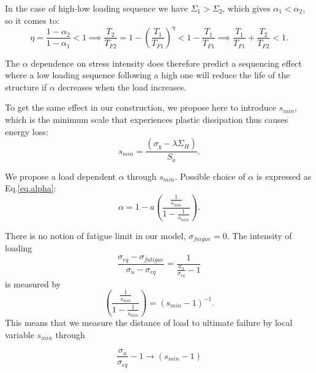In the case of high-low loading sequence we have $\Sigma_1>\Sigma_2$,  which gives $\alpha_1<\alpha_2$, so it comes to:
$$\eta=\frac{1-\alpha_2}{1-\alpha_1}<1 \implies
\frac{T_2}{T_{F2}}=1-\left( \frac{T_1}{T_{F1}}\right) ^\eta<1-\frac{T_1}{T_{F1}} \implies
\frac{T_1}{T_{F1}}+\frac{T_2}{T_{F2}}<1.$$

The $\alpha$ dependence on stress intensity does therefore predict a sequencing effect where a low loading sequence following a high one will reduce the life of the structure if $\alpha$ decreases when the load increases.

To get the same effect in our construction, we propose here to introduce $s_{min}$, which is the minimum scale that experiences plastic dissipation thus causes energy loss:
\begin{equation}
s_{min}=\dfrac{\left(\sigma_y-\lambda \Sigma_H\right)}{S_{a}}.
\label{eq.smin}
\end{equation}

We propose a load dependent $\alpha$ through $s_{min}$. Possible choice
of $\alpha$ is expressed as Eq.\eqref{eq.alpha}:
\begin{equation}
\alpha=1-a\left( \dfrac{\frac{1}{s_{min}}}{1-\frac{1}{s_{min}}} \right) .
\label{eq.alpha}
\end{equation}

There is no notion of fatigue limit in our model, $\sigma_{faigue}=0$. The intensity of loading
$$\frac{ \sigma_{eq}-\sigma_{fatigue}}{ \sigma_{u} - \sigma_{eq}}= \frac{ 1}{\frac{\sigma_{u}}{\sigma_{eq}} -1}$$
is measured by 
$$\left( \dfrac{\frac{1}{s_{min}}}{1-\frac{1}{s_{min}}}\right) =\left(s_{min}-1 \right) ^{-1}.$$
This means that we measure the distance of load to ultimate failure by local variable $s_{min}$ through 

$$\frac{\sigma_{u}}{\sigma_{eq}} -1 \longrightarrow \left( s_{min}-1\right)  $$


